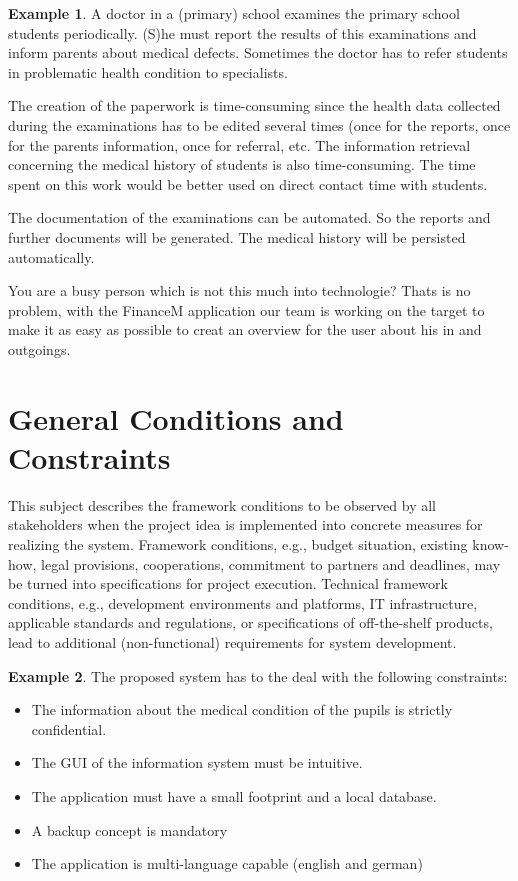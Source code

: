 \documentclass[12pt]{article}
\theoremstyle{definition}
\newtheorem{example}{Example}
\newenvironment{explanation}{%
   \setlength{\parindent}{0pt}
   \itshape
   \color{blue}
}{}
\begin{document}
\begin{example}
A doctor in a (primary) school examines the primary school students periodically. (S)he must report the results of this examinations and inform parents about medical defects. Sometimes the doctor has to refer students in problematic health condition to specialists.

The creation of the paperwork is time-consuming since the health data collected during the examinations has to be edited several times (once for the reports, once for the parents information, once for referral, etc. The information retrieval concerning the medical history of students is also time-consuming. The time spent on this work would be better used on direct contact time with students.

The documentation of the examinations can be automated. So the reports and further documents will be generated. The medical history will be persisted automatically.
\end{example}
You are a busy person which is not this much into technologie?
Thats is no problem, with the FinanceM application our team is working on the target to make it as easy as possible to creat an overview for the user about his in and outgoings.

\pagebreak

\section{General Conditions and Constraints}
\begin{explanation}
This subject describes the framework conditions to be observed by all stakeholders when the project idea is implemented into concrete measures for realizing the system. Framework conditions, e.g., budget situation, existing know-how, legal provisions, cooperations, commitment to partners and deadlines, may be turned into specifications for project execution.
Technical framework conditions, e.g., development environments and platforms, IT infrastructure, applicable standards and regulations, or specifications of off-the-shelf products, lead to additional (non-functional) requirements for system development.
\end{explanation}

\begin{example}
The proposed system has to the deal with the following constraints:
\begin{itemize}
\item The information about the medical condition of the pupils is strictly confidential.
\item The GUI of the information system must be intuitive.
\item The application must have a small footprint and a local database.
\item A backup concept is mandatory
\item The application is multi-language capable (english and german)
\end{itemize}
\end{example}
\end{document}

